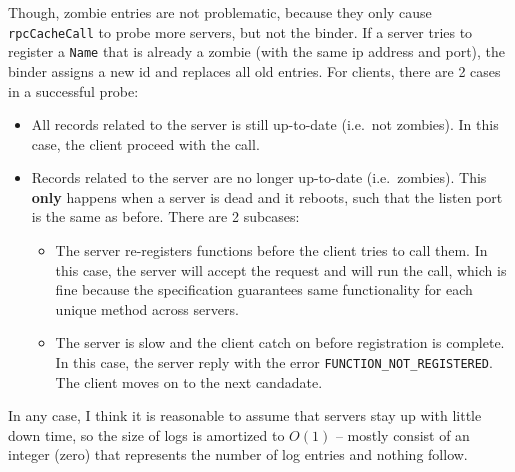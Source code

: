 Though, zombie entries are not problematic, because they only cause {\tt rpcCacheCall} to probe more servers, but not the binder.
If a server tries to register a {\tt Name} that is already a zombie (with the same ip address and port), the binder assigns a new id and replaces all old entries.
For clients, there are 2 cases in a successful probe:
\begin{itemize}
\item
All records related to the server is still up-to-date (i.e.\ not zombies).
In this case, the client proceed with the call.
\item
Records related to the server are no longer up-to-date (i.e.\ zombies).
This {\bf only} happens when a server is dead and it reboots, such that the listen port is the same as before.
There are 2 subcases:
\begin{itemize}
\item
The server re-registers functions before the client tries to call them.
In this case, the server will accept the request and will run the call, which is fine because the specification guarantees same functionality for each unique method across servers.
\item
The server is slow and the client catch on before registration is complete.
In this case, the server reply with the error {\tt FUNCTION\_NOT\_REGISTERED}.
The client moves on to the next candadate.
\end{itemize}
\end{itemize}

In any case, I think it is reasonable to assume that servers stay up with little down time, so the size of logs is amortized to $O(1)$ -- mostly consist of an integer (zero) that represents the number of log entries and nothing follow.
